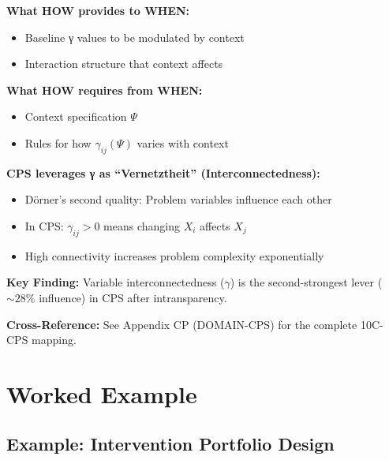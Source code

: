 \begin{tcolorbox}[colback=yellow!5!white, colframe=yellow!75!black,
    title=Integration: CORE-HOW $\leftrightarrow$ CORE-WHEN]
\textbf{What HOW provides to WHEN:}
\begin{itemize}[nosep]
\item Baseline γ values to be modulated by context
\item Interaction structure that context affects
\end{itemize}

\textbf{What HOW requires from WHEN:}
\begin{itemize}[nosep]
\item Context specification $\Psi$
\item Rules for how $\gamma_{ij}(\Psi)$ varies with context
\end{itemize}
\end{tcolorbox}

\begin{tcolorbox}[colback=green!5!white, colframe=green!75!black,
    title=Application Domain: Complex Problem Solving (CP)]
\textbf{CPS leverages γ as ``Vernetztheit'' (Interconnectedness):}
\begin{itemize}[nosep]
\item Dörner's second quality: Problem variables influence each other
\item In CPS: $\gamma_{ij} > 0$ means changing $X_i$ affects $X_j$
\item High connectivity increases problem complexity exponentially
\end{itemize}

\textbf{Key Finding:} Variable interconnectedness ($\gamma$) is the second-strongest lever ($\sim 28\%$ influence) in CPS after intransparency.

\textbf{Cross-Reference:} See Appendix CP (DOMAIN-CPS) for the complete 10C-CPS mapping.
\end{tcolorbox}


\section{Worked Example}
\label{sec:how-example}

\subsection{Example: Intervention Portfolio Design}

